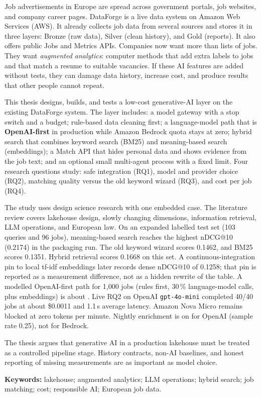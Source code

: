 Job advertisements in Europe are spread across government portals, job websites, and company career pages. DataForge is a live data system on Amazon Web Services (AWS). It already collects job data from several sources and stores it in three layers: Bronze (raw data), Silver (clean history), and Gold (reports). It also offers public Jobs and Metrics APIs. Companies now want more than lists of jobs. They want \emph{augmented analytics}: computer methods that add extra labels to jobs and that match a resume to suitable vacancies. If these AI features are added without tests, they can damage data history, increase cost, and produce results that other people cannot repeat.

This thesis designs, builds, and tests a low-cost generative-AI layer on the existing DataForge system. The layer includes: a model gateway with a stop switch and a budget; rule-based data cleaning first; a language-model path that is \textbf{OpenAI-first} in production while Amazon Bedrock quota stays at zero; hybrid search that combines keyword search (BM25) and meaning-based search (embeddings); a Match API that hides personal data and shows evidence from the job text; and an optional small multi-agent process with a fixed limit. Four research questions study: safe integration (RQ1), model and provider choice (RQ2), matching quality versus the old keyword wizard (RQ3), and cost per job (RQ4).

The study uses design science research with one embedded case. The literature review covers lakehouse design, slowly changing dimensions, information retrieval, LLM operations, and European law. On an expanded labelled test set (103 queries and 96 jobs), meaning-based search reaches the highest nDCG@10 (0.2174) in the packaging run. The old keyword wizard scores 0.1462, and BM25 scores 0.1351. Hybrid retrieval scores 0.1668 on this set. A continuous-integration pin to local tf-idf embeddings later records dense nDCG@10 of 0.1258; that pin is reported as a measurement difference, not as a hidden rewrite of the table. A modelled OpenAI-first path for 1{,}000 jobs (rules first, 30\,\% language-model calls, plus embeddings) is about . Live RQ2 on OpenAI \texttt{gpt-4o-mini} completed 40/40 jobs at about \$0.0011 and 1.1\,s average latency. Amazon Nova Micro remains blocked at zero tokens per minute. Nightly enrichment is on for OpenAI (sample rate 0.25), not for Bedrock.

The thesis argues that generative AI in a production lakehouse must be treated as a controlled pipeline stage. History contracts, non-AI baselines, and honest reporting of missing measurements are as important as model choice.

\vspace{0.8em}
\noindent\textbf{Keywords:} lakehouse; augmented analytics; LLM operations; hybrid search; job matching; cost; responsible AI; European job data.

